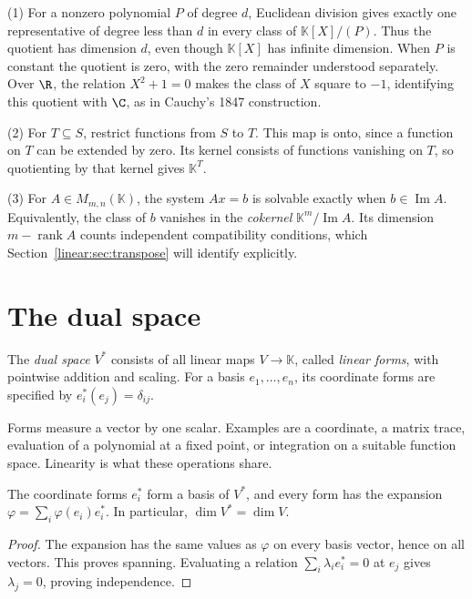 \begin{example}\label{linear:ex:quotients}
(1) For a nonzero polynomial $P$ of degree $d$, Euclidean division gives exactly one representative of degree less than $d$ in every class of $\mathbb K[X]/(P)$. Thus the quotient has dimension $d$, even though $\mathbb K[X]$ has infinite dimension. When $P$ is constant the quotient is zero, with the zero remainder understood separately. Over $\R$, the relation $X^2+1=0$ makes the class of $X$ square to $-1$, identifying this quotient with $\C$, as in Cauchy's 1847 construction.

(2) For $T\subseteq S$, restrict functions from $S$ to $T$. This map is onto, since a function on $T$ can be extended by zero. Its kernel consists of functions vanishing on $T$, so quotienting by that kernel gives $\mathbb K^T$.

(3) For $A\in M_{m,n}(\mathbb K)$, the system $Ax=b$ is solvable exactly when $b\in\operatorname{Im}A$. Equivalently, the class of $b$ vanishes in the \emph{cokernel} $\mathbb K^m/\operatorname{Im}A$. Its dimension $m-\operatorname{rank}A$ counts independent compatibility conditions, which Section~\ref{linear:sec:transpose} will identify explicitly.
\end{example}

\section{The dual space}
\begin{definition}\label{linear:def:dual}
The \emph{dual space} $V^*$ consists of all linear maps $V\to\mathbb K$, called \emph{linear forms}, with pointwise addition and scaling. For a basis $e_1,\ldots,e_n$, its coordinate forms are specified by $e_i^*(e_j)=\delta_{ij}$.
\end{definition}

Forms measure a vector by one scalar. Examples are a coordinate, a matrix trace, evaluation of a polynomial at a fixed point, or integration on a suitable function space. Linearity is what these operations share.

\begin{proposition}\label{linear:prop:dualbasis}
The coordinate forms $e_i^*$ form a basis of $V^*$, and every form has the expansion $\varphi=\sum_i\varphi(e_i)e_i^*$. In particular, $\dim V^*=\dim V$.
\end{proposition}
\begin{proof}
The expansion has the same values as $\varphi$ on every basis vector, hence on all vectors. This proves spanning. Evaluating a relation $\sum_i\lambda_ie_i^*=0$ at $e_j$ gives $\lambda_j=0$, proving independence.
\end{proof}

